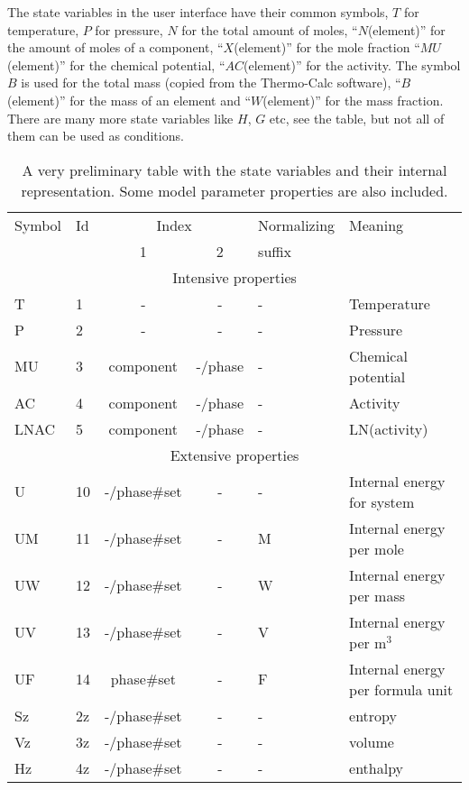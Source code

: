 \documentclass[12pt]{article}
\begin{document}
The state variables in the user interface have their common symbols,
$T$ for temperature, $P$ for pressure, $N$ for the total amount of
moles, ``$N$(element)'' for the amount of moles of a component,
``$X$(element)'' for the mole fraction ``$MU$(element)'' for the
chemical potential, ``$AC$(element)'' for the activity.  The symbol
$B$ is used for the total mass (copied from the Thermo-Calc software),
``$B$(element)'' for the mass of an element and ``$W$(element)'' for
the mass fraction.  There are many more state variables like $H$, $G$
etc, see the table, but not all of them can be used as conditions.

\begin{table}
\caption{A very preliminary table with the state variables and their
internal representation.  Some model parameter properties are also
included.}\label{tab:statevar}
\begin{tabular}{|llccll|}\hline
Symbol & Id & \multicolumn{2}{c}{Index} & Normalizing & Meaning\\
       &    & 1 & 2                     &  suffix     & \\\hline
\multicolumn{6}{|c|}{Intensive properties}\\\hline
T      & 1  & -         & -    & - & Temperature\\
P      & 2  & -         & -    & - & Pressure\\
MU     & 3  & component & -/phase  & - & Chemical potential\\
AC     & 4  & component & -/phase  & - & Activity\\
LNAC   & 5  & component & -/phase  & - & LN(activity)\\\hline
\multicolumn{6}{|c|}{Extensive properties}\\\hline
U      & 10 & -/phase\#set & - & - & Internal energy for system\\
UM     & 11 & -/phase\#set & - & M & Internal energy per mole\\
UW     & 12 & -/phase\#set & - & W & Internal energy per mass\\
UV     & 13 & -/phase\#set & - & V & Internal energy per m$^3$\\
UF     & 14 & phase\#set   & - & F & Internal energy per formula unit\\
Sz     & 2z & -/phase\#set & - & - & entropy\\
Vz     & 3z & -/phase\#set & - & - & volume\\
Hz     & 4z & -/phase\#set & - & - & enthalpy\\

\end{tabular}
\end{table}
\end{document}
